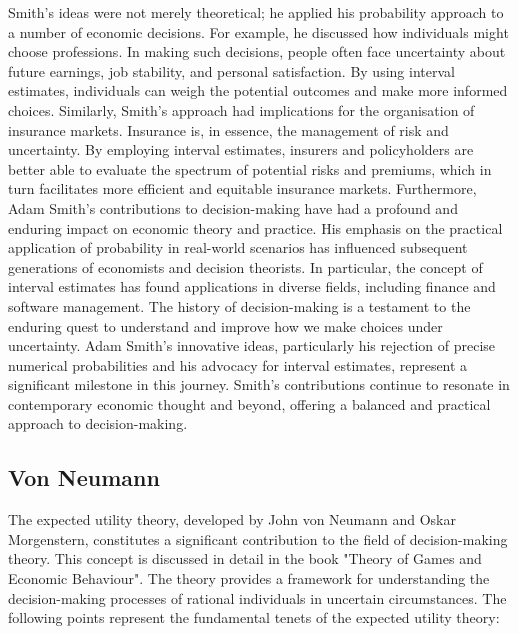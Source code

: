 \noindent Smith's ideas were not merely theoretical; he applied his probability approach to a number of economic decisions. For example, he discussed how individuals might choose professions. In making such decisions, people often face uncertainty about future earnings, job stability, and personal satisfaction. By using interval estimates, individuals can weigh the potential outcomes and make more informed choices.
\newline Similarly, Smith's approach had implications for the organisation of insurance markets. Insurance is, in essence, the management of risk and uncertainty. By employing interval estimates, insurers and policyholders are better able to evaluate the spectrum of potential risks and premiums, which in turn facilitates more efficient and equitable insurance markets. 
Furthermore, Adam Smith's contributions to decision-making have had a profound and enduring impact on economic theory and practice. His emphasis on the practical application of probability in real-world scenarios has influenced subsequent generations of economists and decision theorists. In particular, the concept of interval estimates has found applications in diverse fields, including finance and software management. 
\newline The history of decision-making is a testament to the enduring quest to understand and improve how we make choices under uncertainty. Adam Smith's innovative ideas, particularly his rejection of precise numerical probabilities and his advocacy for interval estimates, represent a significant milestone in this journey. Smith's contributions continue to resonate in contemporary economic thought and beyond, offering a balanced and practical approach to decision-making. 
\cite{brady_adam_2013}

\subsection{Von Neumann}
The expected utility theory, developed by John von Neumann and Oskar Morgenstern, constitutes a significant contribution to the field of decision-making theory. This concept is discussed in detail in the book "Theory of Games and Economic Behaviour"\cite{von_neumann_theory_1944}. The theory provides a framework for understanding the decision-making processes of rational individuals in uncertain circumstances. 
The following points represent the fundamental tenets of the expected utility theory: 


